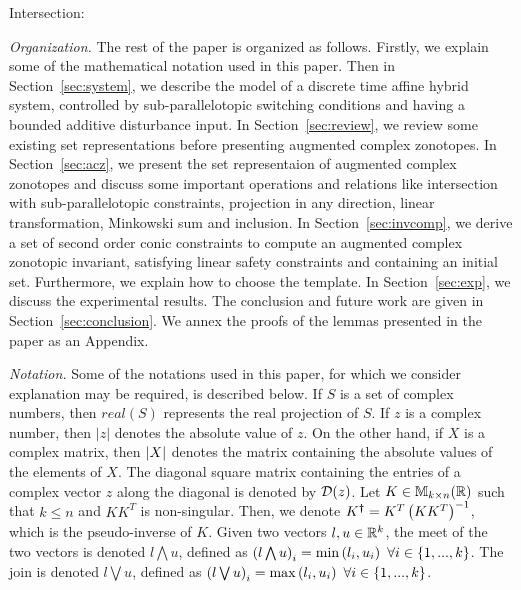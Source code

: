 Intersection: ~\cite{DBLP:journals/mics/MaigaRTC14}

\emph{Organization.}  The rest of the paper is organized as follows.  Firstly, we explain
some of the mathematical notation used in this paper.  Then in
Section~\ref{sec:system}, we describe the model of a discrete time
affine hybrid system, controlled by sub-parallelotopic switching
conditions and having a bounded additive disturbance input.  In
Section~\ref{sec:review}, we review some existing set representations
before presenting augmented complex zonotopes.  In
Section~\ref{sec:acz}, we present the set representaion of augmented
complex zonotopes and discuss some important operations and relations
like intersection with sub-parallelotopic constraints, projection in
any direction, linear transformation, Minkowski sum and inclusion.  In
Section~\ref{sec:invcomp}, we derive a set of second order conic
constraints to compute an augmented complex zonotopic invariant,
satisfying linear safety constraints and containing an initial set.
Furthermore, we explain how to choose the template.  In
Section~\ref{sec:exp}, we discuss the experimental results.  The
conclusion and future work are given in Section~\ref{sec:conclusion}.
We annex the proofs of the lemmas presented in the paper as an
Appendix.

\emph{Notation.} Some of the notations used in this paper, for which we
consider explanation may be required, is described below.  If $S$ is a
set of complex numbers, then $real(S)$ represents the real projection
of $S$.  If $z$ is a complex number, then $|z|$ denotes the absolute
value of $z$.  On the other hand, if $X$ is a complex matrix, then
$\left|X\right|$ denotes the matrix containing the absolute values of the
elements of $X$.  The diagonal square matrix containing the entries of
a complex vector $z$ along the diagonal is denoted by $\mathcal{D}(z)$.  Let
$K\in\mathbb{M}_{k\times n}(\mathbb{\mathbb{R}})$ such that $k\leq n$ and $KK^T$ is
non-singular.  Then, we denote $K^{\bm{\dagger}}=K^T\left(KK^T\right)^{-1}$, which
is the pseudo-inverse of $K$.  Given two vectors $l,u\in\mathbb{R}^k$,
the meet of the two vectors is denoted $l\bigwedge u$, defined as
$\left(l\bigwedge u\right)_i=\min\left(l_i,u_i\right)~\forall i\in\{1,...,k\}$.  The
join is denoted $l\bigvee u$, defined as $\left(l\bigvee
u\right)_i=\max\left(l_i,u_i\right)~\forall i\in\{1,...,k\}$.
